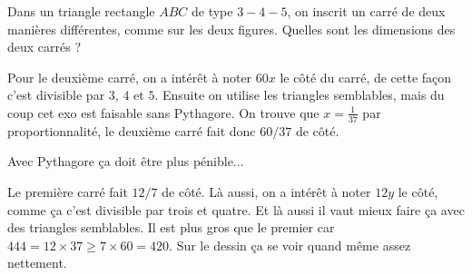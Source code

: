 \begin{exo}
Dans un triangle rectangle $ABC$ de type \og $3-4-5$\fg, on inscrit un carré de deux manières différentes, comme sur les deux figures.
Quelles sont les dimensions des deux carrés ?

\begin{center}
\hspace{1cm}
\end{center}
\begin{sol}
Pour le deuxième carré, on a intérêt à noter $60x$ le côté du carré, de cette façon c'est divisible par $3$, $4$ et $5$. Ensuite on utilise les triangles semblables, mais du coup cet exo est faisable sans Pythagore. On trouve que $x=\frac{1}{37}$ par proportionnalité, le deuxième carré fait donc $60/37$ de côté.

Avec Pythagore ça doit être plus pénible...

Le première carré fait $12/7$ de côté. Là aussi, on a intérêt à noter $12y$ le côté, comme ça c'est divisible par trois et quatre. Et là aussi il vaut mieux faire ça avec des triangles semblables.
Il est plus gros que le premier car $444=12\times 37 \geq 7\times 60=420$. Sur le dessin ça se voir quand même assez nettement.
\end{sol}
\end{exo}






%



